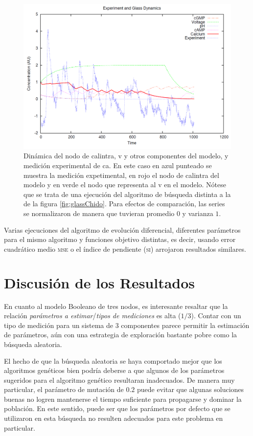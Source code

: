 \begin{figure}[h]
\includegraphics[width=0.9\linewidth]{gfx/glassChafa}
\caption[Dinámica de \ac{calintra}, \ac{v} y otros componentes del modelo, y medición experimental de \ac{ca}]{Dinámica del nodo de \ac{calintra}, \ac{v} y otros componentes del modelo, y medición experimental de \ac{ca}. En este caso en azul punteado se muestra la medición expetimental, en rojo el nodo de \ac{calintra} del modelo y en verde el nodo que representa al \acf{v} en el modelo. Nótese que se trata de una ejecución del algoritmo de búsqueda distinta a la de la figura \ref{fig:glassChido}. Para efectos de comparación, las series se normalizaron de manera que tuvieran promedio $0$ y varianza $1$.}\label{fig:glassChafa}
\end{figure}

Varias ejecuciones del algoritmo de evolución diferencial, diferentes parámetros para el mismo algoritmo y funciones objetivo distintas, es decir, usando error cuadrático medio \textsc{mse} o el índice de pendiente \textsc{(si)} arrojaron resultados similares.


\section{Discusión de los Resultados}

En cuanto al modelo Booleano de tres nodos, es interesante resaltar que la relación \emph{parámetros a estimar}/\emph{tipos de mediciones} es alta ($1/3$). Contar con un tipo de medición para un sistema de 3 componentes parece permitir la estimación de parámetros, aún con una estrategia de exploración bastante pobre como la búsqueda aleatoria.

El hecho de que la búsqueda aleatoria se haya comportado mejor que los algoritmos genéticos bien podría deberse a que algunos de los parámetros sugeridos para el algoritmo genético resultaran inadecuados. De manera muy particular, el parámetro de mutación de $0.2$ puede evitar que algunas soluciones buenas no logren mantenerse el tiempo suficiente para propagarse y dominar la población. En este sentido, puede ser que los parámetros por defecto que se utilizaron en esta búsqueda no resulten adecuados para este problema en particular.

